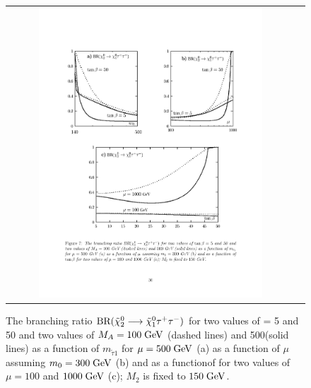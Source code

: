 \begin{figure}[tbh!]
	\centering
	\begin{tabular}{cc}
		\includegraphics[width=0.80\textwidth]{theory/pics/br_chitautau.pdf}
	\end{tabular}
	\caption{The branching ratio $\text{BR}(\tilde{\chi}^{0}_{2} \longrightarrow \tilde{\chi}^{0}_{1}\tau^{+}\tau^{-} )$ for two values of \tanbeta = 5 and 50 and two values of $M_{A} = 100\;\text{Ge}\kern-0.06667em\text{V}$ (dashed lines) and 500\gev (solid lines) as a function of $m_{\widetilde{\tau}1}$  for $\mu = 500\;\text{Ge}\kern-0.06667em\text{V}$ (a) as a function of $\mu$ assuming $m_{0} = 300\;\text{Ge}\kern-0.06667em\text{V}$ (b) and as a functionof \tanbeta for two values of $\mu = 100$ and $1000\;\text{Ge}\kern-0.06667em\text{V}$ (c); $M_{2}$ is fixed to $150\;\text{Ge}\kern-0.06667em\text{V}$\cite{Djouadi:2001fa}.}
	\label{fig:br_chitautau}
	
\end{figure}

